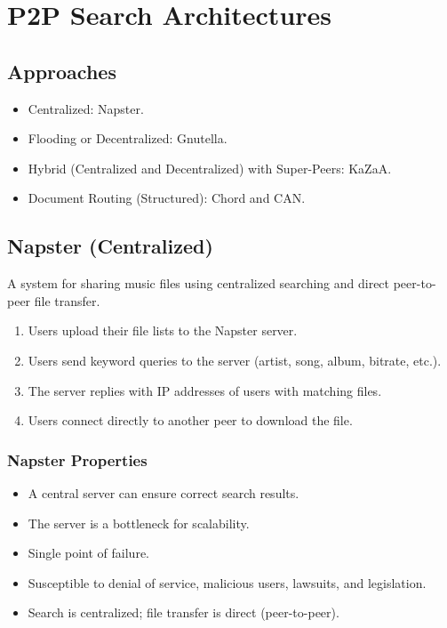 \documentclass{article}
\begin{document}
\section{P2P Search Architectures}

\subsection{Approaches}
\begin{itemize}
    \item Centralized: Napster.
    \item Flooding or Decentralized: Gnutella.
    \item Hybrid (Centralized and Decentralized) with Super-Peers: KaZaA.
    \item Document Routing (Structured): Chord and CAN.
\end{itemize}

\subsection{Napster (Centralized)}

A system for sharing music files using centralized searching and direct peer-to-peer file transfer.

\begin{enumerate}
    \item Users upload their file lists to the Napster server.
    \item Users send keyword queries to the server (artist, song, album, bitrate, etc.).
    \item The server replies with IP addresses of users with matching files.
    \item Users connect directly to another peer to download the file.
\end{enumerate}

\subsubsection{Napster Properties}
\begin{itemize}
    \item A central server can ensure correct search results.
    \item The server is a bottleneck for scalability.
    \item Single point of failure.
    \item Susceptible to denial of service, malicious users, lawsuits, and legislation.
    \item Search is centralized; file transfer is direct (peer-to-peer).
\end{itemize}
\end{document}
